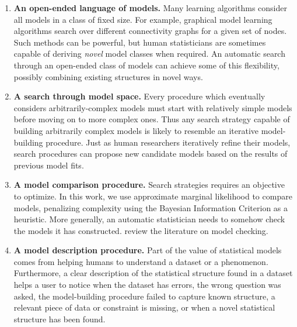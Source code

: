 \begin{enumerate}
\item {\bf An open-ended language of models.}
Many learning algorithms consider all models in a class of fixed size.
For example, graphical model learning algorithms \citep{Friedman03,Eaton07_uai} search over different connectivity graphs for a given set of nodes.
Such methods can be powerful, but human statisticians are sometimes capable of deriving \emph{novel} model classes when required.
An automatic search through an open-ended class of models can achieve some of this flexibility, %
possibly combining existing structures in novel ways.

\item {\bf A search through model space.}
Every procedure which eventually considers arbitrarily-complex models must start with relatively simple models before moving on to more complex ones.
Thus any search strategy capable of building arbitrarily complex models is likely to resemble an iterative model-building procedure.
Just as human researchers iteratively refine their models, search procedures can propose new candidate models based on the results of previous model fits.

\item {\bf A model comparison procedure.}
Search strategies requires an objective to optimize.
In this work, we use approximate marginal likelihood to compare models, penalizing complexity using the Bayesian Information Criterion as a heuristic.
More generally, an automatic statistician needs to somehow check the models it has constructed.
\citet{gelman2012philosophy} review the literature on model checking.

\item {\bf A model description procedure.}
Part of the value of statistical models comes from helping humans to understand a dataset or a phenomenon.
Furthermore, a clear description of the statistical structure found in a dataset helps a user to notice when the dataset has errors, the wrong question was asked, the model-building procedure failed to capture known structure, a relevant piece of data or constraint is missing, or when a novel statistical structure has been found.
\end{enumerate}

